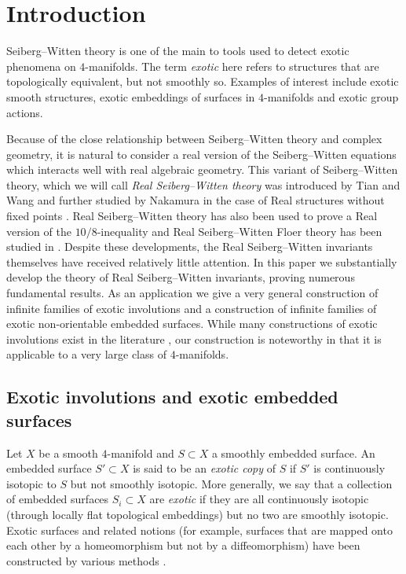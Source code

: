 \documentclass{amsart}
\theoremstyle{definition}
\theoremstyle{remark}
\numberwithin{equation}{section}
\begin{document}


\section{Introduction}

Seiberg--Witten theory is one of the main to tools used to detect exotic phenomena on $4$-manifolds. The term {\em exotic} here refers to structures that are topologically equivalent, but not smoothly so. Examples of interest include exotic smooth structures, exotic embeddings of surfaces in $4$-manifolds and exotic group actions.

Because of the close relationship between Seiberg--Witten theory and complex geometry, it is natural to consider a real version of the Seiberg--Witten equations which interacts well with real algebraic geometry. This variant of Seiberg--Witten theory, which we will call {\em Real Seiberg--Witten theory} was introduced by Tian and Wang \cite{tw} and further studied by Nakamura in the case of Real structures without fixed points \cite{na,na2}. Real Seiberg--Witten theory has also been used to prove a Real version of the $10/8$-inequality \cite{kato} and Real Seiberg--Witten Floer theory has been studied in \cite{kmt,mi,bh}. Despite these developments, the Real Seiberg--Witten invariants themselves have received relatively little attention. In this paper we substantially develop the theory of Real Seiberg--Witten invariants, proving numerous fundamental results. As an application we give a very general construction of infinite families of exotic involutions and a construction of infinite families of exotic non-orientable embedded surfaces. While many constructions of exotic involutions exist in the literature \cite{ue,fss,sung,mi}, our construction is noteworthy in that it is applicable to a very large class of $4$-manifolds.


\subsection{Exotic involutions and exotic embedded surfaces}

Let $X$ be a smooth $4$-manifold and $S \subset X$ a smoothly embedded surface. An embedded surface $S' \subset X$ is said to be an {\em exotic copy} of $S$ if $S'$ is continuously isotopic to $S$ but not smoothly isotopic. More generally, we say that a collection of embedded surfaces $S_i \subset X$ are {\em exotic} if they are all continuously isotopic (through locally flat topological embeddings) but no two are smoothly isotopic. Exotic surfaces and related notions (for example, surfaces that are mapped onto each other by a homeomorphism but not by a diffeomorphism) have been constructed by various methods \cite{fs,fin,kim,kr,mark,bar3,mi}.
\end{document}
